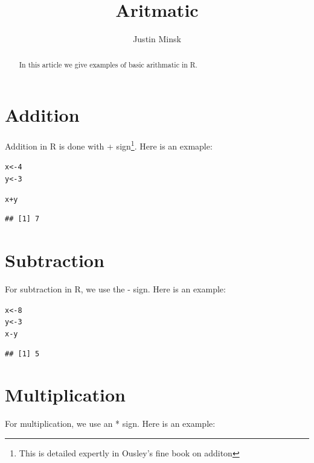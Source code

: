 \documentclass{article}\usepackage[]{graphicx}\usepackage[]{color}
\makeatletter
\newcommand{\hlnum}[1]{\textcolor[rgb]{0.686,0.059,0.569}{#1}}%
\newcommand{\hlopt}[1]{\textcolor[rgb]{0,0,0}{#1}}%
\newcommand{\hlstd}[1]{\textcolor[rgb]{0.345,0.345,0.345}{#1}}%
\newcommand{\hlkwb}[1]{\textcolor[rgb]{0.69,0.353,0.396}{#1}}%
\newenvironment{kframe}{%
 \def\at@end@of@kframe{}%
 \ifinner\ifhmode%
  \def\at@end@of@kframe{\end{minipage}}%
  \begin{minipage}{\columnwidth}%
 \fi\fi%
 \def\FrameCommand##1{\hskip\@totalleftmargin \hskip-\fboxsep
 \colorbox{shadecolor}{##1}\hskip-\fboxsep
     \hskip-\linewidth \hskip-\@totalleftmargin \hskip\columnwidth}%
 \MakeFramed {\advance\hsize-\width
   \@totalleftmargin\z@ \linewidth\hsize
   \@setminipage}}%
 {\par\unskip\endMakeFramed%
 \at@end@of@kframe}
\newenvironment{knitrout}{}{} %
\makeatother
\begin{document}
\title{Aritmatic}
\author{Justin Minsk}
\maketitle

\begin{abstract}
In this article we give examples of basic arithmatic in R.
\end{abstract}

\section{Addition}
Addition in R is done with + sign\footnote{This is detailed expertly in Ousley's fine book on additon}. Here is an exmaple:

\begin{knitrout}
\color{fgcolor}\begin{kframe}
\begin{alltt}
\hlstd{x} \hlkwb{<-} \hlnum{4}
\hlstd{y} \hlkwb{<-} \hlnum{3}

\hlstd{x}\hlopt{+}\hlstd{y}
\end{alltt}
\begin{verbatim}
## [1] 7
\end{verbatim}
\end{kframe}
\end{knitrout}

\section{Subtraction}
For subtraction in R, we use the - sign. Here is an example:

\begin{knitrout}
\color{fgcolor}\begin{kframe}
\begin{alltt}
\hlstd{x} \hlkwb{<-} \hlnum{8}
\hlstd{y} \hlkwb{<-} \hlnum{3}
\hlstd{x} \hlopt{-} \hlstd{y}
\end{alltt}
\begin{verbatim}
## [1] 5
\end{verbatim}
\end{kframe}
\end{knitrout}

\section{Multiplication}
For multiplication, we use an * sign. Here is an example:
\end{document}
